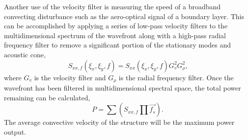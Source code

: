 Another use of the velocity filter is measuring the speed of a broadband convecting disturbance such as the aero-optical signal of a boundary layer.
This can be accomplished by applying a series of low-pass velocity filters to the multidimensional spectrum of the wavefront along with a high-pass radial frequency filter to remove a significant portion of the stationary modes and acoustic cone,
\begin{equation}
  S_{xx,f}(\xi_x,\xi_y,f) = S_{xx}(\xi_x,\xi_y,f) G_v^2 G_\rho^2 \textrm{,}
\end{equation}
where $G_v$ is the velocity filter and $G_\rho$ is the radial frequency filter.
Once the wavefront has been filtered in multidimensional spectral space, the total power remaining can be calculated,
\begin{equation}
  P = \sum (S_{xx,f}\prod{\overrightarrow{f_s}}) \textrm{.}
\end{equation}
The average convective velocity of the structure will be the maximum power output.

